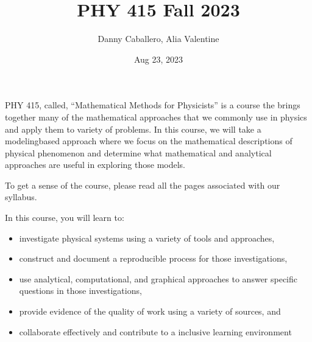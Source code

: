 \documentclass[letterpaper,10pt,english]{jupyterBook}
\title{PHY 415 Fall 2023}
\date{Aug 23, 2023}
\author{Danny Caballero, Alia Valentine}
\begin{document}
\pagestyle{empty}
\sphinxmaketitle
\pagestyle{plain}
\sphinxtableofcontents
\pagestyle{normal}
\label{\detokenize{content/intro::doc}}


\sphinxAtStartPar
PHY 415, called, “Mathematical Methods for Physicists” is a course the brings together many of the mathematical approaches that we commonly use in physics and apply them to variety of problems. In this course, we will take a modeling\sphinxhyphen{}based approach where we focus on the mathematical descriptions of physical phenomenon and determine what mathematical and analytical approaches are useful in exploring those models.

\sphinxAtStartPar
To get a sense of the course, please read all the pages associated with our syllabus.

\begin{DUlineblock}{0em}
\item[] 
\end{DUlineblock}

\sphinxAtStartPar
In this course, you will learn to:
\begin{itemize}
\item {} 
\sphinxAtStartPar
investigate physical systems using a variety of tools and approaches,

\item {} 
\sphinxAtStartPar
construct and document a reproducible process for those investigations,

\item {} 
\sphinxAtStartPar
use analytical, computational, and graphical approaches to answer specific questions in those investigations,

\item {} 
\sphinxAtStartPar
provide evidence of the quality of work using a variety of sources, and

\item {} 
\sphinxAtStartPar
collaborate effectively and contribute to a inclusive learning environment

\end{itemize}
\end{document}
